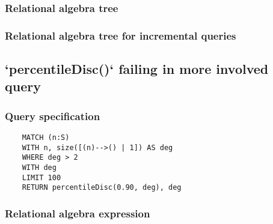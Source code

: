 	\subsubsection*{Relational algebra tree}


	\subsubsection*{Relational algebra tree for incremental queries}

	\subsection{`percentileDisc()` failing in more involved query}

	\subsubsection*{Query specification}

	\begin{lstlisting}
	MATCH (n:S)
	WITH n, size([(n)-->() | 1]) AS deg
	WHERE deg > 2
	WITH deg
	LIMIT 100
	RETURN percentileDisc(0.90, deg), deg
	\end{lstlisting}


	\subsubsection*{Relational algebra expression}

